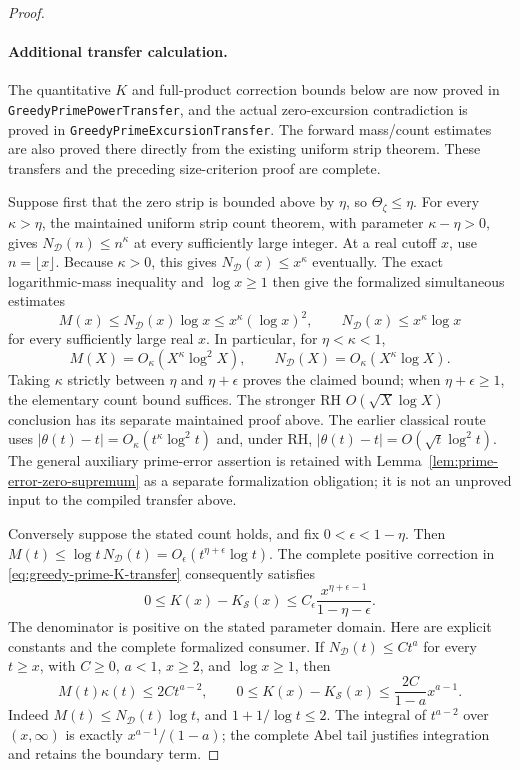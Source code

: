 \documentclass[11pt]{article}
\theoremstyle{definition}
\begin{document}
\begin{proof}
\paragraph{Additional transfer calculation.}
The quantitative $K$ and full-product correction bounds below are now
proved in \texttt{GreedyPrimePowerTransfer}, and the actual zero-excursion
contradiction is proved in \texttt{GreedyPrimeExcursionTransfer}.
The forward mass/count estimates are also proved there directly from
the existing uniform strip theorem. These transfers and the preceding
size-criterion proof are complete.

Suppose first that the zero strip is bounded above by \(\eta\),
so \(\Theta_\zeta\le\eta\). For every \(\kappa>\eta\), the maintained
uniform strip count theorem, with parameter \(\kappa-\eta>0\), gives
\(N_{\mathcal D}(n)\le n^\kappa\) at every sufficiently large integer.
At a real cutoff \(x\), use \(n=\lfloor x\rfloor\).
Because \(\kappa>0\), this gives \(N_{\mathcal D}(x)\le x^\kappa\)
eventually. The exact logarithmic-mass inequality and \(\log x\ge1\)
then give the formalized simultaneous estimates
\[
 M(x)\le N_{\mathcal D}(x)\log x
       \le x^\kappa(\log x)^2,\qquad
 N_{\mathcal D}(x)\le x^\kappa\log x
\]
for every sufficiently large real \(x\). In particular, for
\(\eta<\kappa<1\),
\[
 M(X)=O_\kappa(X^\kappa\log^2X),\qquad
 N_{\mathcal D}(X)=O_\kappa(X^\kappa\log X).
\]
Taking \(\kappa\) strictly between \(\eta\) and \(\eta+\epsilon\)
proves the claimed bound; when \(\eta+\epsilon\ge1\),
the elementary count bound suffices.
The stronger RH \(O(\sqrt X\log X)\) conclusion has its separate
maintained proof above.
The earlier classical route uses
\(\lvert\theta(t)-t\rvert=O_\kappa(t^\kappa\log^2t)\) and, under RH,
\(\lvert\theta(t)-t\rvert=O(\sqrt t\log^2t)\).
The general auxiliary prime-error assertion is retained with
Lemma~\ref{lem:prime-error-zero-supremum} as a separate formalization
obligation; it is not an unproved input to the compiled transfer above.

Conversely suppose the stated count holds, and fix
$0<\epsilon<1-\eta$. Then
$M(t)\le\log t\,N_{\mathcal D}(t)
=O_\epsilon(t^{\eta+\epsilon}\log t)$.
The complete positive correction in
\eqref{eq:greedy-prime-K-transfer} consequently satisfies
\begin{equation}
 0\le K(x)-K_{\mathcal S}(x)
 \le C_\epsilon
       \frac{x^{\eta+\epsilon-1}}{1-\eta-\epsilon}.
 \label{eq:greedy-prime-zero-signal-error}
\end{equation}
The denominator is positive on the stated parameter domain.
Here are explicit constants and the complete formalized consumer.
If \(N_{\mathcal D}(t)\le Ct^a\) for every \(t\ge x\), with
\(C\ge0\), \(a<1\), \(x\ge2\), and \(\log x\ge1\), then
\[
 M(t)\kappa(t)\le2Ct^{a-2},\qquad
 0\le K(x)-K_{\mathcal S}(x)
 \le\frac{2C}{1-a}x^{a-1}.
\]
Indeed \(M(t)\le N_{\mathcal D}(t)\log t\), and
\(1+1/\log t\le2\). The integral of \(t^{a-2}\) over \((x,\infty)\)
is exactly \(x^{a-1}/(1-a)\); the complete Abel tail justifies
integration and retains the boundary term.


\end{proof}
\end{document}
